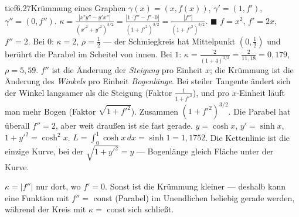 \begin{loesungkarte}{tief}{6.27}{Krümmung eines Graphen}
$\gamma(x) = (x, f(x))$, $\gamma' = (1, f')$, $\gamma'' = (0, f'')$. $\kappa = \frac{|x'y'' - y'x''|}{(x'^{2} + y'^{2})^{3/2}} = \frac{|1\cdot f'' - f'\cdot0|}{(1 + f'^{2})^{3/2}} = \frac{|f''|}{(1 + f'^{2})^{3/2}}$. $\blacksquare$
$f = x^{2}$, $f' = 2x$, $f'' = 2$. Bei $0$: $\kappa = 2$, $\rho = \frac12$ --- der Schmiegkreis hat Mittelpunkt $(0, \frac12)$ und berührt die Parabel im Scheitel von innen. Bei $1$: $\kappa = \frac2{(1 + 4)^{3/2}} = \frac2{11{,}18} = 0{,}179$, $\rho = 5{,}59$.
$f''$ ist die Änderung der \emph{Steigung} pro Einheit $x$; die Krümmung ist die Änderung des \emph{Winkels} pro Einheit \emph{Bogenlänge}. Bei steiler Tangente ändert sich der Winkel langsamer als die Steigung (Faktor $\frac1{1 + f'^{2}}$), und pro $x$-Einheit läuft man mehr Bogen (Faktor $\sqrt{1 + f'^{2}}$). Zusammen $(1 + f'^{2})^{3/2}$. Die Parabel hat überall $f'' = 2$, aber weit draußen ist sie fast gerade.
$y = \cosh x$, $y' = \sinh x$, $1 + y'^{2} = \cosh^{2}x$. $L = \int_0^1\cosh x\,dx = \sinh1 = 1{,}1752$. Die Kettenlinie ist die einzige Kurve, bei der $\sqrt{1 + y'^{2}} = y$ --- Bogenlänge gleich Fläche unter der Kurve.
\begin{mitnehmen}\kastentext
$\kappa = |f''|$ nur dort, wo $f' = 0$. Sonst ist die Krümmung kleiner --- deshalb kann eine Funktion mit $f'' = $ const (Parabel) im Unendlichen beliebig gerade werden, während der Kreis mit $\kappa = $ const sich schließt.
\end{mitnehmen}
\end{loesungkarte}

